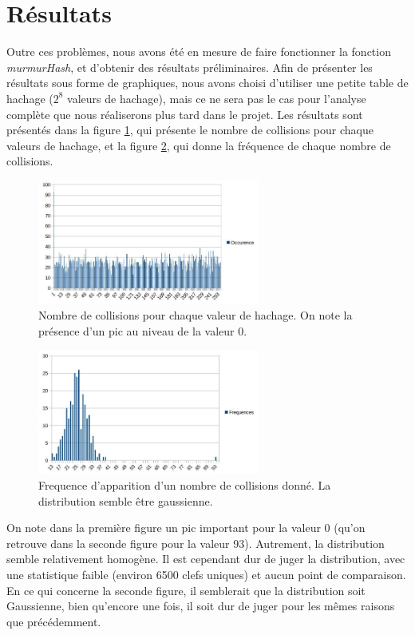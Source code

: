 \documentclass[final,twoside,article,10pt]{scrartcl}
\begin{document}
\section{Résultats}
Outre ces problèmes, nous avons été en mesure de faire fonctionner la fonction \textit{murmurHash}, et d'obtenir des résultats préliminaires.
    Afin de présenter les résultats sous forme de graphiques, nous avons choisi d'utiliser une petite table de hachage ($2^8$ valeurs de hachage), mais ce ne sera pas le cas pour l'analyse complète que nous réaliserons plus tard dans le projet.
    Les résultats sont présentés dans la figure \ref{fig:distrib}, qui présente le nombre de collisions pour chaque valeurs de hachage, et la figure \ref{fig:freq}, qui donne la fréquence de chaque nombre de collisions.
    \begin{figure}[h!]
        \begin{center}
            \includegraphics[width=0.65\textwidth]{./figures/hashDistribution}
            \caption{Nombre de collisions pour chaque valeur de hachage. On note la présence d'un pic au niveau de la valeur 0.}
            \label{fig:distrib}
        \end{center}
    \end{figure}
    \begin{figure}[h!]
        \begin{center}
            \includegraphics[width=0.65\textwidth]{./figures/frequencies}
            \caption{Frequence d'apparition d'un nombre de collisions donné. La distribution semble être gaussienne.}
            \label{fig:freq}
        \end{center}
    \end{figure}
    On note dans la première figure un pic important pour la valeur 0 (qu'on retrouve dans la seconde figure pour la valeur 93). Autrement, la distribution semble relativement homogène. Il est cependant dur de juger la distribution, avec une statistique faible (environ 6500 clefs uniques) et aucun point de comparaison. En ce qui concerne la seconde figure, il semblerait que la distribution soit Gaussienne, bien qu'encore une fois, il soit dur de juger pour les mêmes raisons que précédemment.
\end{document}

